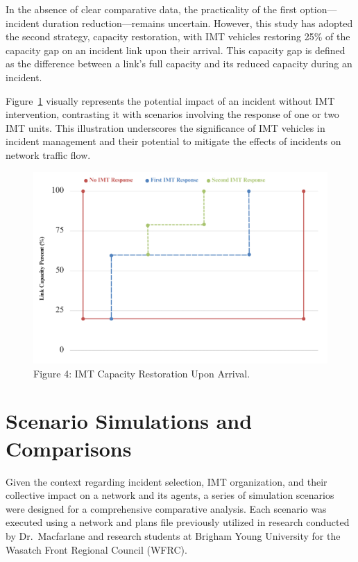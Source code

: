 \documentclass[fancy, oneside, mastersfancy, ms]{byuthesis}
\begin{document}
In the absence of clear comparative data, the practicality of the first
option---incident duration reduction---remains uncertain. However, this
study has adopted the second strategy, capacity restoration, with IMT
vehicles restoring 25\% of the capacity gap on an incident link upon
their arrival. This capacity gap is defined as the difference between a
link's full capacity and its reduced capacity during an incident.

Figure~\ref{fig-Cap_Restore} visually represents the potential impact of
an incident without IMT intervention, contrasting it with scenarios
involving the response of one or two IMT units. This illustration
underscores the significance of IMT vehicles in incident management and
their potential to mitigate the effects of incidents on network traffic
flow.

\begin{figure}

{\centering \includegraphics{figures/cap_restore.png}

}

\caption{\label{fig-Cap_Restore}Figure 4: IMT Capacity Restoration Upon
Arrival.}

\end{figure}

\hypertarget{scenario-simulations-and-comparisons}{%
\section{Scenario Simulations and
Comparisons}\label{scenario-simulations-and-comparisons}}

Given the context regarding incident selection, IMT organization, and
their collective impact on a network and its agents, a series of
simulation scenarios were designed for a comprehensive comparative
analysis. Each scenario was executed using a network and plans file
previously utilized in research conducted by Dr.~Macfarlane and research
students at Brigham Young University for the Wasatch Front Regional
Council (WFRC).
\end{document}
